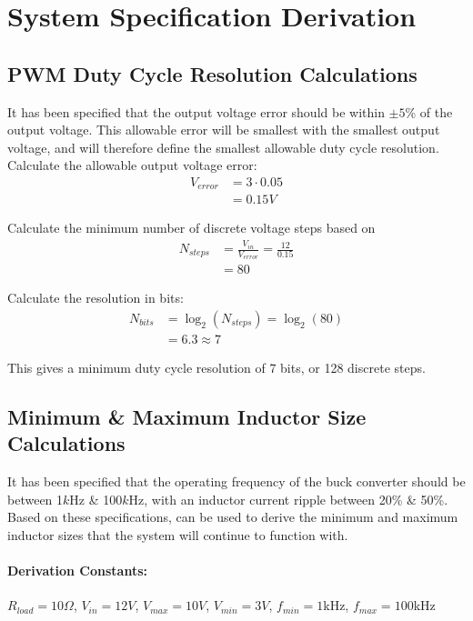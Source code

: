 \chapter{System Specification Derivation} \label{A:specs}


\section*{PWM Duty Cycle Resolution Calculations}

It has been specified that the output voltage error should be within $\pm 5\%$ of the output voltage. This allowable error will be smallest with the smallest output voltage, and will therefore define the smallest allowable duty cycle resolution.\\

Calculate the allowable output voltage error:
\begin{align}
    V_{error} &= 3 \cdot 0.05\\
    &=0.15V \nonumber
\end{align}

Calculate the minimum number of discrete voltage steps based on 
\begin{align}
    N_{steps} &= \frac{V_{in}}{V_{error}} = \frac{12}{0.15}\\
    &=80 \nonumber
\end{align}

Calculate the resolution in bits:
\begin{align}
    N_{bits} &= \log_2(N_{steps}) = \log_2(80)\\
    &=6.3 \approx 7 \nonumber
\end{align}

This gives a minimum duty cycle resolution of 7 bits, or 128 discrete steps.



\section*{Minimum \& Maximum Inductor Size Calculations}

It has been specified that the operating frequency of the buck converter should be between 1$k$Hz \& 100$k$Hz, with an inductor current ripple between 20\% \& 50\%. Based on these specifications,  can be used to derive the minimum and maximum inductor sizes that the system will continue to function with. \\

\subsubsection*{Derivation Constants:}
$R_{load} = 10\Omega$, $V_{in} = 12V$, $V_{max} = 10V$, $V_{min} = 3V$, $f_{min} = 1$kHz, $f_{max} = 100$kHz\\


